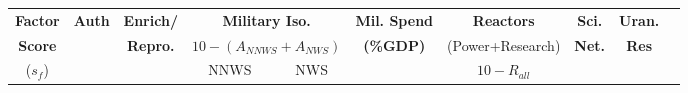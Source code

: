 \begin{table}
\centering
\begin{tabular}{|c|c|c|c|c|c|c|c|c|c|}
\hline
\textbf{Factor}      & \textbf{Auth}          & \textbf{Enrich/}      & \multicolumn{2}{c|}{\textbf{Military Iso.}}          & \textbf{Mil. Spend} &  \textbf{Reactors}  & \textbf{Sci.} & \textbf{Uran.} \\
\textbf{Score}  &                        &  \textbf{Repro.}   & \multicolumn{2}{c|}{$10 - (A_{NNWS}+A_{NWS})$}  & \textbf{(\%GDP)}    &   (Power+Research) & \textbf{Net.} &  \textbf{Res} \\
\cline{4-5}
 ($s_{f}$)           &                         &                       &  NNWS                 & NWS               &                    & $10 - R_{all}$&               &              \\



\end{tabular}
\end{table}
